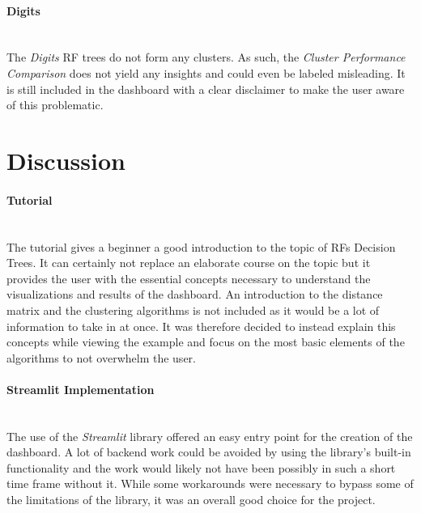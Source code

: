 \documentclass[a4paper, 12pt]{article}
\begin{document}
\paragraph{Digits}\mbox{}\\
The \textit{Digits} RF trees do not form any
clusters. As such, the \textit{Cluster Performance Comparison} does not yield any insights and could even be
labeled misleading. It is still included in the dashboard with a clear disclaimer to make the user aware of
this problematic.

\section{Discussion}
\paragraph{Tutorial}\mbox{}\\
The tutorial gives a beginner a good introduction to the topic of RFs Decision Trees. It can certainly not
replace an elaborate course on the topic but it provides the user with the essential concepts necessary to
understand the visualizations and results of the dashboard. An introduction to the distance matrix and the
clustering algorithms is not included as it would be a lot of information to take in at once. It was
therefore decided to instead explain this concepts while viewing the example and focus on the most basic
elements of the algorithms to not overwhelm the user. \par

\paragraph{Streamlit Implementation}\mbox{}\\
The use of the \textit{Streamlit} library offered an easy entry point for the creation of the dashboard.
A lot of backend work could be avoided by using the library's built-in functionality and the work would
likely not have been possibly in such a short time frame without it. While some workarounds were necessary
to bypass some of the limitations of the library, it was an overall good choice for the project. \par
\end{document}
